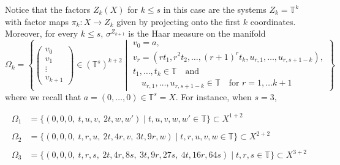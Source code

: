 \documentclass[letter, 11pt]{article}
\theoremstyle{definition}
\theoremstyle{plain}
\newcommand{\T}{\mathbb{T}}
\newcommand{\1}{\mathbbm{1}}
\begin{document}
Notice that the factors $Z_k(X)$ for $k \leq s$ in this case are the systems $Z_k = \T^k$ with factor maps $\pi_k \colon X \to Z_k$ given by projecting onto the first $k$ coordinates. Moreover, for every $k \leq s$, $\sigma^{Z_{k+1}}$ is the Haar measure on the manifold
\begin{equation*}
    \Omega_k = \left\{ \left(\begin{array}{c}
         v_0 \\
         v_1 \\
         \vdots \\
         v_{k+1}
    \end{array} \right)
     \in (\T^s)^{k+2} \middle| \begin{array}{c}
          v_0 = a, \\
          v_r = ( r t_1, r^2 t_2, \ldots, (r+1)^rt_k, u_{r,1}, \ldots,u_{r,s+1-k}),  \\
           t_1, \dots, t_k \in \T \quad \text{and} \\
           \quad u_{r,1}, \ldots, u_{r,s+1-k} \in \T \quad \text{for } r=1,\dots k+1
     \end{array} \right\}
\end{equation*}
where we recall that $a= (0,\ldots,0) \in \T^s=X$. 
For instance, when $s=3$,%

\begin{align*}
    \Omega_1 &= \{(0,0,0, \ t, u,v, \ 2t, w,w'  ) \mid t, u,v,w,w' \in \T \} \subset X^{1+2} \\ \\
   \Omega_2  &= \{(0,0,0, \ t,r, u, \ 2t, 4r, v, \ 3t,9r,w ) \mid t,r, u,v,w \in \T \} \subset X^{2+2} \\ \\
    \Omega_3  &= \{(0,0,0,\ t,r, s, \ 2t, 4r, 8s,\ 3t,9r, 27s,\ 4t, 16r,64s) \mid t,r, s \in \T \} \subset X^{3+2} \\
\end{align*}
\end{document}
